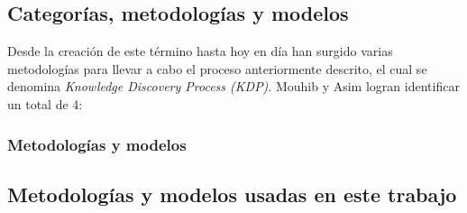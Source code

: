 \subsection{Categorías, metodologías y modelos \label{sec:problem_categories}}
Desde la creación de este término hasta hoy en día han surgido varias metodologías para llevar a cabo el proceso anteriormente descrito, el cual se denomina \textit{Knowledge Discovery Process (KDP)}. Mouhib y Asim \cite{knowledge_discovery} logran identificar un total de 4:

\subsubsection{Metodologías y modelos \label{sec:knowledge_discovery_models}}

\subsection{Metodologías y modelos usadas en este trabajo \label{sec:problem_categories}}
